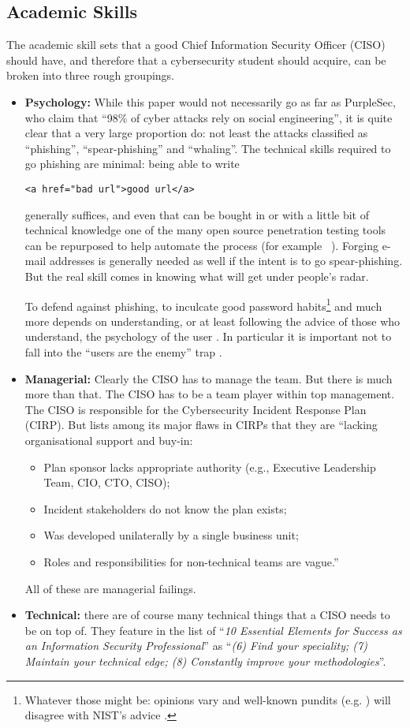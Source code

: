 \documentclass[conference]{IEEEtran}
\begin{document}
\subsection{Academic Skills}\label{sec:academic}
The academic skill sets that a good Chief Information Security Officer (CISO) should have, and therefore that a cybersecurity student should acquire, can be broken into three rough groupings.
\begin{itemize}
\item{\bf Psychology:} While this paper would not necessarily go as far as PurpleSec, who claim \cite{PurpleSec2020a} that ``98\% of cyber attacks rely on social engineering'', it is quite clear that a very large proportion do: not least the attacks classified as ``phishing'', ``spear-phishing'' and ``whaling''. The technical skills required to go phishing are minimal: being able to write
\begin{verbatim}
<a href="bad url">good url</a>
\end{verbatim}
generally suffices, and even that can be bought in or with a little bit of technical knowledge one of the many open source penetration testing tools can be repurposed to help automate the process (for example ~\cite{goPhish,king-Phisher}).  Forging e-mail addresses is generally needed as well if the intent is to go spear-phishing. But the real skill comes in knowing what will get under people's radar.
\par
To defend against phishing, to inculcate good password habits\footnote{Whatever those might be: opinions vary and well-known pundits (e.g. \cite{Grimes2019b}) will disagree with NIST's advice \cite{NIST2019e}.} and much more depends on understanding, or at least following the advice of those who understand, the psychology of the user \cite{InglesantSasse2010a}. In particular it is important not to fall into the ``users are the enemy'' trap \cite{AdamsSasse1999}.
\item{\bf Managerial:} Clearly the CISO has to manage the team. But there is much more than that. The CISO has to be a team player within top management. The CISO is responsible for the Cybersecurity Incident Response Plan (CIRP). But \cite{Secureworks2019a} lists among its major flaws in CIRPs that they are ``lacking organisational support and buy-in:
\begin{itemize}
\item Plan sponsor lacks appropriate authority
(e.g., Executive Leadership Team, CIO, CTO, CISO);
\item Incident stakeholders do not know the plan exists;
\item Was developed unilaterally by a single business unit;
\item Roles and responsibilities for non-technical teams are vague.''
\end{itemize}
All of these are managerial failings.
\item{\bf Technical:} there are of course many technical things that a CISO needs to be on top of.  They feature in the list \cite{Beaver2017a} of ``{\emph{10 Essential Elements for Success as an Information Security Professional}}'' as ``{\emph{(6) Find your speciality; (7) Maintain your technical edge; (8) Constantly improve your methodologies}}''.


\end{itemize}
\end{document}
